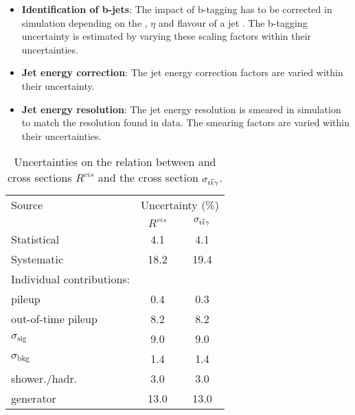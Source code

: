 \begin{itemize}
\item \textbf{Identification of b-jets}: The impact of b-tagging has to be corrected in simulation depending on the \pt , $\eta$ and flavour of a jet \cite{CMS-PAS-BTV-13-001}. The b-tagging uncertainty is estimated by varying these scaling factors within their uncertainties.
\item \textbf{Jet energy correction}: The jet energy correction factors are varied within their uncertainty.
\item \textbf{Jet energy resolution}: The jet energy resolution is smeared in simulation to match the resolution found in data. The smearing factors are varied within their uncertainties.
\end{itemize}

\begin{table}[ht]
\centering
\caption{Uncertainties on the relation between \ttbar and \ttgamma cross sections $R^{vis}$ and the \ttgamma cross section $\sigma_{\mathrm{t}\overline{\mathrm{t}} \gamma}$.}
\label{tab_ttg_sys}
\begin{tabular}{l c c} \\

\hline

\hline

Source & \multicolumn{2}{c}{Uncertainty (\%)} \\

& $R^{vis}$ & $\sigma_{\mathrm{t}\overline{\mathrm{t}} \gamma}$ \\

\hline

Statistical & 4.1 & 4.1 \\

\hline

Systematic & 18.2 & 19.4 \\

\hline

Individual contributions: & & \\

\;\;\;pileup & 0.4 & 0.3 \\

\;\;\;out-of-time pileup & 8.2 & 8.2 \\

\;\;\;$\sigma_{\mathrm{ sig}}$ & 9.0 & 9.0 \\

\;\;\;$\sigma_{\mathrm {bkg}}$ & 1.4 & 1.4 \\

\;\;\;shower./hadr. & 3.0 & 3.0 \\

\;\;\;generator & 13.0 & 13.0 \\


\end{tabular}
\end{table}
